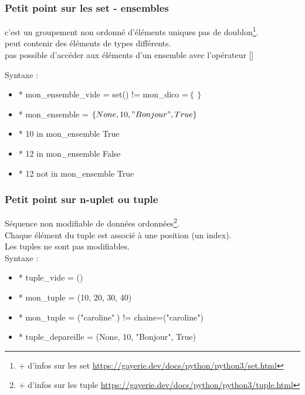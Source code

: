 \begin{frame}
  \frametitle{Petit point sur les set - ensembles}
   c'est un groupement non ordonné d’éléments uniques  pas de doublon\footnote{+ d'infos sur les set \url{https://gayerie.dev/docs/python/python3/set.html}}.\\
   peut contenir des éléments de types différents.\\
   pas possible d’accéder aux éléments d’un ensemble avec l’opérateur [] 
  
  Syntaxe :
  
  \begin{itemize}
\item*  mon\_ensemble\_vide = set() !=  mon\_dico =$\left\{\right\}$
\item* mon\_ensemble = $\left\{None, 10, "Bonjour",True \right\}$
\item* 10 in mon\_ensemble  True
\item* 12 in mon\_ensemble  False
\item* 12 not in mon\_ensemble  True
\end{itemize}
\end{frame}

\begin{frame}
  \frametitle{Petit point sur n-uplet ou tuple}
  
  Séquence non modifiable de données ordonnées\footnote{+ d'infos sur les tuple \url{https://gayerie.dev/docs/python/python3/tuple.html}}. \\
  Chaque élément du tuple est associé à une position (un index).\\ 
  Les tuples ne sont pas modifiables.\\ 
 
 Syntaxe :
 
   \begin{itemize}
   
\item*  tuple\_vide = ()
\item* mon\_tuple = (10, 20, 30, 40)
\item*  mon\_tuple = ("caroline"\textcolor{orange}{,}) != chaine=("caroline") 
\item* tuple\_depareille = (None, 10, "Bonjour", True)
 
\end{itemize}
\end{frame}


